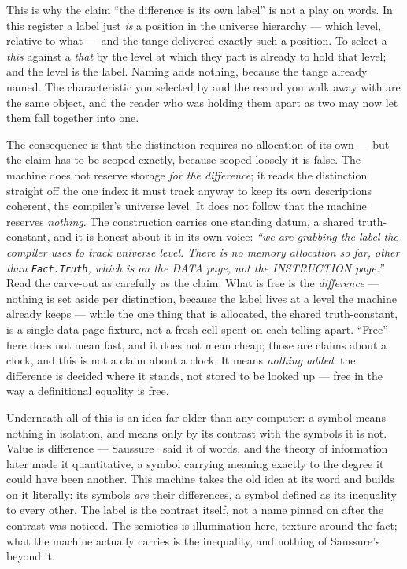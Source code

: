 This is why the claim ``the difference is its own label'' is not a play on words. In this register a label just
\emph{is} a position in the universe hierarchy --- which level, relative to what --- and the tange delivered exactly
such a position. To select a \emph{this} against a \emph{that} by the level at which they part is already to hold that
level; and the level is the label. Naming adds nothing, because the tange already named. The characteristic you
selected by and the record you walk away with are the same object, and the reader who was holding them apart as two
may now let them fall together into one.

The consequence is that the distinction requires no allocation of its own --- but the claim has to be scoped exactly,
because scoped loosely it is false. The machine does not reserve storage \emph{for the difference}; it reads the
distinction straight off the one index it must track anyway to keep its own descriptions coherent, the compiler's
universe level. It does not follow that the machine reserves \emph{nothing}. The construction carries one standing
datum, a shared truth-constant, and it is honest about it in its own voice: \emph{``we are grabbing the label the
compiler uses to track universe level. There is no memory allocation so far, other than \texttt{Fact.Truth}, which is
on the DATA page, not the INSTRUCTION page.''} Read the carve-out as carefully as the claim. What is free is the
\emph{difference} --- nothing is set aside per distinction, because the label lives at a level the machine already
keeps --- while the one thing that is allocated, the shared truth-constant, is a single data-page fixture, not a fresh
cell spent on each telling-apart. ``Free'' here does not mean fast, and it does not mean cheap; those are claims about
a clock, and this is not a claim about a clock. It means \emph{nothing added}: the difference is decided where it
stands, not stored to be looked up --- free in the way a definitional equality is free.

Underneath all of this is an idea far older than any computer: a symbol means nothing in isolation, and means only by
its contrast with the symbols it is not. Value is difference --- Saussure~\cite{saussure1916} said it of words, and
the theory of information later made it quantitative, a symbol carrying meaning exactly to the degree it could have
been another. This machine takes the old idea at its word and builds on it literally: its symbols \emph{are} their
differences, a symbol defined as its inequality to every other. The label is the contrast itself, not a name pinned on
after the contrast was noticed. The semiotics is illumination here, texture around the fact; what the machine actually
carries is the inequality, and nothing of Saussure's beyond it.


